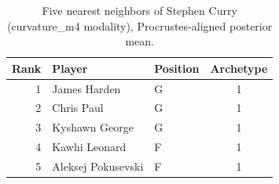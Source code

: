 \begin{table}[htbp]
  \centering\small
  \begin{tabular}{rllc}
    \toprule
    Rank & Player & Position & Archetype \\
    \midrule
    1 & James Harden & G & 1 \\
    2 & Chris Paul & G & 1 \\
    3 & Kyshawn George & G & 1 \\
    4 & Kawhi Leonard & F & 1 \\
    5 & Aleksej Pokusevski & F & 1 \\
    \bottomrule
  \end{tabular}
  \caption{Five nearest neighbors of Stephen Curry (curvature_m4 modality), Procrustes-aligned posterior mean.}
  \label{tab:Stephen_Curry_neighbors_curvature_m4}
\end{table}

